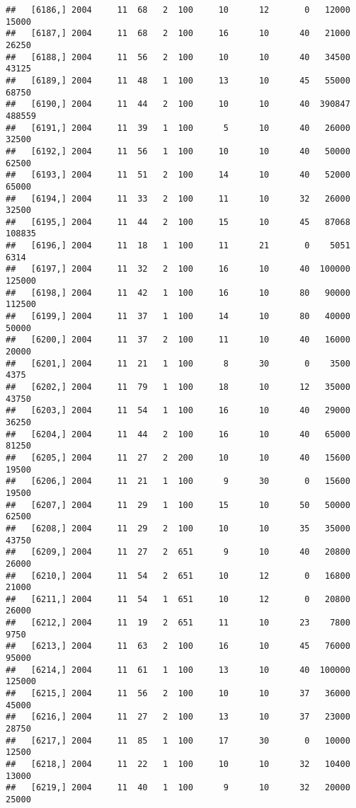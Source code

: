 \documentclass{article}\usepackage[]{graphicx}\usepackage[]{color}
\makeatletter
\newenvironment{kframe}{%
 \def\at@end@of@kframe{}%
 \ifinner\ifhmode%
  \def\at@end@of@kframe{\end{minipage}}%
  \begin{minipage}{\columnwidth}%
 \fi\fi%
 \def\FrameCommand##1{\hskip\@totalleftmargin \hskip-\fboxsep
 \colorbox{shadecolor}{##1}\hskip-\fboxsep
     \hskip-\linewidth \hskip-\@totalleftmargin \hskip\columnwidth}%
 \MakeFramed {\advance\hsize-\width
   \@totalleftmargin\z@ \linewidth\hsize
   \@setminipage}}%
 {\par\unskip\endMakeFramed%
 \at@end@of@kframe}
\newenvironment{knitrout}{}{} %
\makeatother
\begin{document}
\begin{knitrout}
\begin{kframe}
\begin{verbatim}
##   [6186,] 2004     11  68   2  100     10      12       0   12000   15000
##   [6187,] 2004     11  68   2  100     16      10      40   21000   26250
##   [6188,] 2004     11  56   2  100     10      10      40   34500   43125
##   [6189,] 2004     11  48   1  100     13      10      45   55000   68750
##   [6190,] 2004     11  44   2  100     10      10      40  390847  488559
##   [6191,] 2004     11  39   1  100      5      10      40   26000   32500
##   [6192,] 2004     11  56   1  100     10      10      40   50000   62500
##   [6193,] 2004     11  51   2  100     14      10      40   52000   65000
##   [6194,] 2004     11  33   2  100     11      10      32   26000   32500
##   [6195,] 2004     11  44   2  100     15      10      45   87068  108835
##   [6196,] 2004     11  18   1  100     11      21       0    5051    6314
##   [6197,] 2004     11  32   2  100     16      10      40  100000  125000
##   [6198,] 2004     11  42   1  100     16      10      80   90000  112500
##   [6199,] 2004     11  37   1  100     14      10      80   40000   50000
##   [6200,] 2004     11  37   2  100     11      10      40   16000   20000
##   [6201,] 2004     11  21   1  100      8      30       0    3500    4375
##   [6202,] 2004     11  79   1  100     18      10      12   35000   43750
##   [6203,] 2004     11  54   1  100     16      10      40   29000   36250
##   [6204,] 2004     11  44   2  100     16      10      40   65000   81250
##   [6205,] 2004     11  27   2  200     10      10      40   15600   19500
##   [6206,] 2004     11  21   1  100      9      30       0   15600   19500
##   [6207,] 2004     11  29   1  100     15      10      50   50000   62500
##   [6208,] 2004     11  29   2  100     10      10      35   35000   43750
##   [6209,] 2004     11  27   2  651      9      10      40   20800   26000
##   [6210,] 2004     11  54   2  651     10      12       0   16800   21000
##   [6211,] 2004     11  54   1  651     10      12       0   20800   26000
##   [6212,] 2004     11  19   2  651     11      10      23    7800    9750
##   [6213,] 2004     11  63   2  100     16      10      45   76000   95000
##   [6214,] 2004     11  61   1  100     13      10      40  100000  125000
##   [6215,] 2004     11  56   2  100     10      10      37   36000   45000
##   [6216,] 2004     11  27   2  100     13      10      37   23000   28750
##   [6217,] 2004     11  85   1  100     17      30       0   10000   12500
##   [6218,] 2004     11  22   1  100     10      10      32   10400   13000
##   [6219,] 2004     11  40   1  100      9      10      32   20000   25000

\end{verbatim}
\end{kframe}
\end{knitrout}
\end{document}
